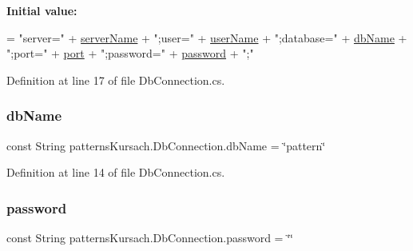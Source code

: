 {\bfseries Initial value\+:}
\begin{DoxyCode}
= 
            \textcolor{stringliteral}{"server="} 
            + \mbox{\hyperlink{classpatterns_kursach_1_1_db_connection_a3d3e6dbf6c6e37527a5a6885fc9f2a3a}{serverName}} +
            \textcolor{stringliteral}{";user="} + \mbox{\hyperlink{classpatterns_kursach_1_1_db_connection_a7d457ab2278b176330c807719ab43b17}{userName}} +
            \textcolor{stringliteral}{";database="} + \mbox{\hyperlink{classpatterns_kursach_1_1_db_connection_a004b474e138bf030a0b26677203aa28a}{dbName}} +
            \textcolor{stringliteral}{";port="} + \mbox{\hyperlink{classpatterns_kursach_1_1_db_connection_a320a0f64312ebe973e6bedbd4643ae40}{port}} +
            \textcolor{stringliteral}{";password="} + \mbox{\hyperlink{classpatterns_kursach_1_1_db_connection_af01a81bc636c18072192a923e1f7d4d6}{password}} + \textcolor{stringliteral}{";"}
\end{DoxyCode}


Definition at line 17 of file Db\+Connection.\+cs.

\mbox{\label{classpatterns_kursach_1_1_db_connection_a004b474e138bf030a0b26677203aa28a}} 
\subsubsection{\texorpdfstring{db\+Name}{dbName}}
{\footnotesize\ttfamily const String patterns\+Kursach.\+Db\+Connection.\+db\+Name = \char`\"{}pattern\char`\"{}}



Definition at line 14 of file Db\+Connection.\+cs.

\mbox{\label{classpatterns_kursach_1_1_db_connection_af01a81bc636c18072192a923e1f7d4d6}} 
\subsubsection{\texorpdfstring{password}{password}}
{\footnotesize\ttfamily const String patterns\+Kursach.\+Db\+Connection.\+password = \char`\"{}\char`\"{}}



